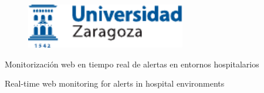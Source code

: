 \documentclass[a4paper,12pt,twoside,hidelinks,openright]{report}
\begin{document}

\begin{titlepage}

\vspace*{-4mm}
\begin{figure}[!h]
  \centering
	\includegraphics[width=69.62mm]{Imagenes/UnizarLogo}
\end{figure}

\vspace*{17mm}

\fontsize{28pt}{28pt}\selectfont
\begin{center}
\setlength{\fboxsep}{3.4mm}
\end{center}

\vspace*{18.7mm}


\fontsize{20pt}{20pt}\selectfont
\begin{center}
Monitorización web en tiempo real de alertas en entornos hospitalarios
\end{center}
\baselineskip 20pt
\begin{center}
Real-time web monitoring for alerts in hospital environments
\end{center}

\vspace*{1cm} 
\baselineskip 36pt
\begin{center}
\fontsize{12pt}{12pt}\selectfont
{}

\vspace*{3.65mm} 
\fontsize{18pt}{18pt}\selectfont
{}
\vspace*{1cm}
\baselineskip 36pt
\fontsize{12pt}{12pt}\selectfont
{}
\vspace*{3.56mm}
\fontsize{14pt}{14pt}\selectfont
{}
\vspace*{1cm}
\fontsize{12pt}{12pt}\selectfont
{}
\vspace*{3.56mm}
\fontsize{14pt}{14pt}\selectfont
{}
\end{center}


\end{titlepage}
\end{document}
